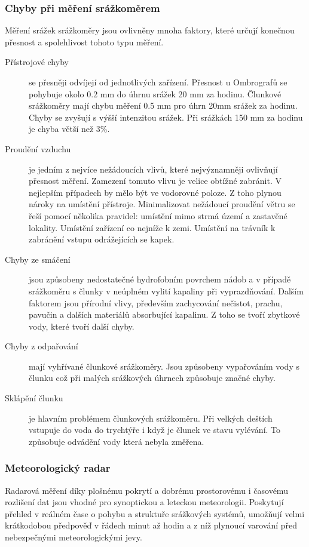 \documentclass[a4paper,12pt]{article}
\begin{document}
\subsubsection*{Chyby při měření srážkoměrem} 
Měření srážek srážkoměry jsou ovlivněny mnoha faktory, které určují konečnou přesnost a spolehlivost tohoto typu měření.
\begin{description} 
\item[Přístrojové chyby] se přesněji odvíjejí od jednotlivých zařízení. Přesnost u Ombrografů se pohybuje okolo 0.2 mm do  úhrnu srážek 20 mm za hodinu. Člunkové srážkoměry mají chybu měření 0.5 mm pro úhrn 20mm  srážek za hodinu. Chyby se zvyšují s výšší intenzitou srážek. Při srážkách 150 mm za  hodinu je chyba větší než 3\%. \cite{wmo}
\item[Proudění vzduchu] je jedním z nejvíce nežádoucích vlivů, které nejvýznamněji ovlivňují přesnost měření. Zamezení tomuto vlivu je velice obtížné zabránit. V nejlepším případech by mělo být ve vodorovné poloze. Z toho plynou nároky na umístění přístroje. Minimalizovat nežádoucí proudění větru se řeší pomocí několika pravidel: umístění mimo strmá území a zastavěné lokality. Umístění zařízení co nejníže k zemi. Umístění na trávník k zabránění vstupu odrážejících se kapek. 
\item[Chyby ze smáčení] jsou způsobeny nedostatečné hydrofobním povrchem nádob a v případě srážkoměru s člunky v neúplném vylití kapaliny při vyprazdňování. Dalším faktorem jsou přírodní vlivy, především zachycování nečistot, prachu, pavučin a dalších materiálů absorbující kapalinu. Z toho se tvoří zbytkové vody, které tvoří další chyby. 
\item[Chyby z odpařování] mají vyhřívané člunkové srážkoměry. Jsou způsobeny vypařováním vody s člunku což při malých srážkových úhrnech způsobuje značné chyby.
\item[Sklápění člunku] je hlavním problémem člunkových srážkoměru. Při velkých deštích vstupuje do voda do trychtýře i když je člunek ve stavu vylévání. To způsobuje odvádění vody která nebyla změřena. 

\end{description}
\newpage
\subsubsection{Meteorologický radar}
Radarová měření díky plošnému pokrytí a dobrému prostorovému i časovému rozlišení dat jsou vhodné pro synoptickou a leteckou meteorologii. Poskytují přehled v reálném čase o pohybu a struktuře srážkových systémů, umožňují velmi krátkodobou předpověď v řádech minut až hodin a z níž plynoucí varování před nebezpečnými meteorologickými jevy.\cite{radar_chmu}
\end{document}
